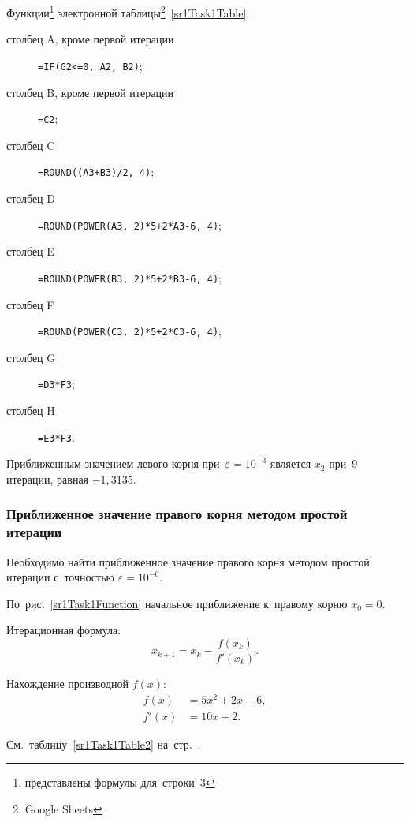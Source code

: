 \documentclass[10pt, a4paper, titlepage]{article}
\begin{document}
Функции\footnote{представлены формулы для~строки~3} электронной таблицы\footnote{Google Sheets}~\ref{sr1Task1Table}:
\begin{description}
    \item[столбец A, кроме первой итерации] \verb"=IF(G2<=0, A2, B2)";
    
    \item[столбец B, кроме первой итерации] \verb"=C2";
    
    \item[столбец C] \verb"=ROUND((A3+B3)/2, 4)";
    
    \item[столбец D] \verb"=ROUND(POWER(A3, 2)*5+2*A3-6, 4)";
    
    \item[столбец E] \verb"=ROUND(POWER(B3, 2)*5+2*B3-6, 4)";
    
    \item[столбец F] \verb"=ROUND(POWER(C3, 2)*5+2*C3-6, 4)";
    
    \item[столбец G] \verb"=D3*F3";
    
    \item[столбец H] \verb"=E3*F3".

\end{description}

Приближенным значением левого корня при~$\varepsilon=10^{-3}$ является $x_2$ при~$9$ итерации, равная $-1,3135$.

\subsubsection*{Приближенное значение правого корня методом простой итерации}

Необходимо найти приближенное значение правого корня методом простой итерации с~точностью $\varepsilon=10^{-6}$.

По~рис.~\ref{sr1Task1Function} начальное приближение к~правому корню $x_0=0$.

Итерационная формула: $$x_{k+1}=x_k-\frac{f(x_k)}{f'(x_k)} .$$

Нахождение производной $f(x)$:
\begin{align*}
    f(x) &= 5x^2+2x-6, \\
    f'(x) &= 10x+2.
\end{align*}

См.~таблицу~\ref{sr1Task1Table2} на~стр.~\pageref{sr1Task1Table2}.
\end{document}
